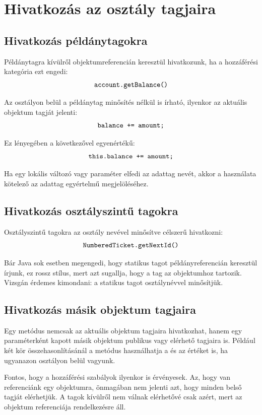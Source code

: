 \section{Hivatkozás az osztály tagjaira}

\subsection{Hivatkozás példánytagokra}

Példánytagra kívülről objektumreferencián keresztül hivatkozunk, ha a hozzáférési kategória ezt engedi:
\[
  \texttt{account.getBalance()}
\]

Az osztályon belül a példánytag minősítés nélkül is írható, ilyenkor az aktuális objektum tagját jelenti:
\[
  \texttt{balance += amount;}
\]

Ez lényegében a következővel egyenértékű:
\[
  \texttt{this.balance += amount;}
\]

Ha egy lokális változó vagy paraméter elfedi az adattag nevét, akkor a  használata kötelező az adattag egyértelmű megjelöléséhez.

\subsection{Hivatkozás osztályszintű tagokra}

Osztályszintű tagokra az osztály nevével minősítve célszerű hivatkozni:
\[
  \texttt{NumberedTicket.getNextId()}
\]

Bár Java sok esetben megengedi, hogy statikus tagot példányreferencián keresztül írjunk, ez rossz stílus, mert azt sugallja, hogy a tag az objektumhoz tartozik. Vizsgán érdemes kimondani: a statikus tagot osztálynévvel minősítjük.

\subsection{Hivatkozás másik objektum tagjaira}

Egy metódus nemcsak az aktuális objektum tagjaira hivatkozhat, hanem egy paraméterként kapott másik objektum publikus vagy elérhető tagjaira is. Például két kör összehasonlításánál a metódus használhatja a  és az  értéket is, ha ugyanazon osztályon belül vagyunk.

Fontos, hogy a hozzáférési szabályok ilyenkor is érvényesek. Az, hogy van referenciánk egy objektumra, önmagában nem jelenti azt, hogy minden belső tagját elérhetjük. A  tagok kívülről nem válnak elérhetővé csak azért, mert az objektum referenciája rendelkezésre áll.

